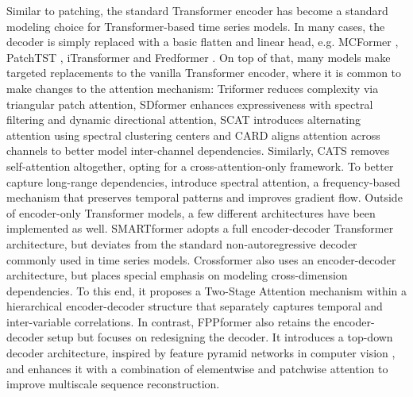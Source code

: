 \documentclass[a4paper,oneside,bibliography=totoc]{scrbook}
\begin{document}
\noindent
Similar to patching, the standard Transformer encoder \cite{vaswani_attention_2017} has become a standard modeling choice for Transformer-based time series models. 
In many cases, the decoder is simply replaced with a basic flatten and linear head, e.g. MCFormer \cite{han_mcformer_2024}, PatchTST \cite{nie_time_2022}, iTransformer \cite{liu_itransformer_2023} and Fredformer \cite{piao_fredformer_2024}. 
On top of that, many models
make targeted replacements to the vanilla Transformer encoder, where it is common to make changes to the attention mechanism:  
Triformer \cite{cirstea_triformer_2022} reduces complexity via triangular patch attention, SDformer \cite{zhou_sdformer_2024} enhances expressiveness with spectral filtering and dynamic directional attention, SCAT \cite{zhou_scat_2024} introduces alternating attention using spectral clustering centers and CARD \cite{wang_card_2023} aligns attention across channels to better model inter-channel dependencies. 
Similarly, CATS \cite{lu_cats_2024} removes self-attention altogether, opting for a cross-attention-only framework.
To better capture long-range dependencies, \citet{kang_introducing_2024} introduce spectral attention, a frequency-based mechanism that preserves temporal patterns and improves gradient flow.
Outside of encoder-only Transformer models, a few different architectures have been implemented as well. 
SMARTformer \cite{li_smartformer_2023} adopts a full encoder-decoder Transformer architecture, but deviates from the standard non-autoregressive decoder commonly used in time series models. 
Crossformer \cite{zhang_crossformer_2022} also uses an encoder-decoder architecture, but places special emphasis on modeling cross-dimension dependencies. To this end, it proposes a Two-Stage Attention mechanism within a hierarchical encoder-decoder structure that separately captures temporal and inter-variable correlations. 
In contrast, FPPformer \cite{shen_take_2024} also retains the encoder-decoder setup but focuses on redesigning the decoder. It introduces a top-down decoder architecture, inspired by feature pyramid networks in computer vision \cite{lin_feature_2017}, and enhances it with a combination of elementwise and patchwise attention to improve multiscale sequence reconstruction.
\end{document}

